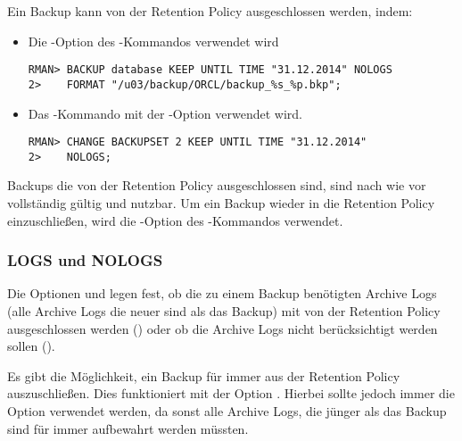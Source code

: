         Ein Backup kann von der Retention Policy ausgeschlossen werden, indem:
        \begin{itemize}
          \item Die -Option des -Kommandos verwendet wird
            \begin{lstlisting}[caption={Ein neues Backup aus der Retention Policy ausschlie\ss{}en},label=admin1029,language=rman]
RMAN> BACKUP database KEEP UNTIL TIME "31.12.2014" NOLOGS
2>    FORMAT "/u03/backup/ORCL/backup_%s_%p.bkp";
            \end{lstlisting}
          \item Das -Kommando mit der -Option verwendet wird.
            \begin{lstlisting}[caption={Ein bestehendes Backup aus der Retention Policy ausschlie\ss{}en},label=admin1030,language=rman]
RMAN> CHANGE BACKUPSET 2 KEEP UNTIL TIME "31.12.2014"
2>    NOLOGS;
            \end{lstlisting}
        \end{itemize}
        Backups die von der Retention Policy ausgeschlossen sind, sind nach wie vor vollst\"andig g\"ultig und nutzbar. Um ein Backup wieder in die Retention Policy einzuschlie\ss{}en, wird die -Option des -Kommandos verwendet.
        \subsubsection{LOGS und NOLOGS}
          Die Optionen  und  legen fest, ob die zu einem Backup ben\"otigten Archive Logs (alle Archive Logs die neuer sind als das Backup) mit von der Retention Policy ausgeschlossen werden () oder ob die Archive Logs nicht ber\"ucksichtigt werden sollen ().

          Es gibt die M\"oglichkeit, ein Backup f\"ur immer aus der Retention Policy auszuschlie\ss{}en. Dies funktioniert mit der Option . Hierbei sollte jedoch immer die Option  verwendet werden, da sonst alle Archive Logs, die j\"unger als das Backup sind f\"ur immer aufbewahrt werden m\"ussten.
